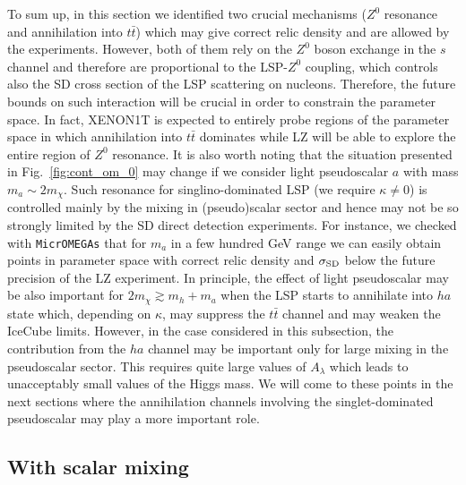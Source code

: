 \documentclass[12pt,twoside]{article}
\begin{document}
To sum up, in this section we identified two crucial mechanisms 
($Z^0$ resonance and annihilation into $t\bar{t}$) which may give correct 
relic density and are allowed by the experiments. However, both of them rely 
on the $Z^0$ boson exchange in the $s$ channel and therefore are proportional 
to the LSP-$Z^0$ coupling, which controls also the SD cross section of the 
LSP scattering on nucleons. Therefore, the future bounds on such interaction 
will be crucial in order to constrain the parameter space. In fact, XENON1T  is expected to entirely probe regions of the parameter space in
which annihilation into $t\bar{t}$ dominates while LZ will be able to explore the entire region of $Z^0$ resonance.
It is also worth 
noting that the situation presented in Fig.~\ref{fig:cont_om_0} may change 
if we consider light pseudoscalar $a$ with mass $m_a\sim 2m_\chi$. 
Such resonance for singlino-dominated LSP (we require $\kappa\not=0$) is 
controlled mainly by the mixing in (pseudo)scalar sector and hence may not 
be so strongly limited by the SD direct detection experiments. For instance, 
we checked with \texttt{MicrOMEGAs} that for $m_a$ in a few hundred GeV 
range we can easily obtain points in parameter space with correct relic 
density and $\sigma_{\rm SD}$
below the future precision of the LZ 
experiment. In principle, the effect of light pseudoscalar may be also 
important for $2m_\chi\gtrsim m_h+m_a$ when the LSP starts to annihilate 
into $h a$ state which, depending on $\kappa$, may suppress the $t\bar{t}$ 
channel and may weaken the IceCube limits. 
However, in the case considered in this subsection, the contribution 
from the $h a$ channel may be important only for large mixing in the  
pseudoscalar sector. This requires quite large values of $A_\lambda$ 
which leads to unacceptably small values of the Higgs mass.
We will come to these points in the next sections where the annihilation 
channels involving the singlet-dominated pseudoscalar may play 
a more important role.



\subsection{With scalar mixing \label{ssec:bs_fh_mix}}
\end{document}
